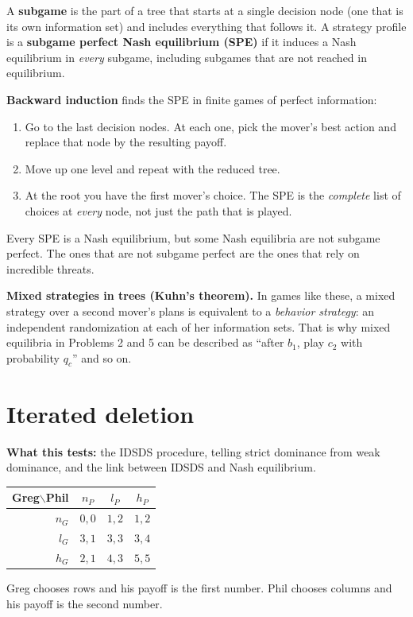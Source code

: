 \documentclass[11pt]{article}
\begin{document}
\begin{keyidea}
A \textbf{subgame} is the part of a tree that starts at a single decision node (one that is its own information set) and includes everything that follows it. A strategy profile is a \textbf{subgame perfect Nash equilibrium (SPE)} if it induces a Nash equilibrium in \emph{every} subgame, including subgames that are not reached in equilibrium.
\end{keyidea}
\textbf{Backward induction} finds the SPE in finite games of perfect information:
\begin{enumerate}
\item Go to the last decision nodes. At each one, pick the mover's best action and replace that node by the resulting payoff.
\item Move up one level and repeat with the reduced tree.
\item At the root you have the first mover's choice. The SPE is the \emph{complete} list of choices at \emph{every} node, not just the path that is played.
\end{enumerate}
Every SPE is a Nash equilibrium, but some Nash equilibria are not subgame perfect. The ones that are not subgame perfect are the ones that rely on incredible threats.

\textbf{Mixed strategies in trees (Kuhn's theorem).} In games like these, a mixed strategy over a second mover's plans is equivalent to a \emph{behavior strategy}: an independent randomization at each of her information sets. That is why mixed equilibria in Problems 2 and 5 can be described as ``after $b_1$, play $c_2$ with probability $q_c$'' and so on.

\newpage
\section{Iterated deletion}

\textbf{What this tests:} the IDSDS procedure, telling strict dominance from weak dominance, and the link between IDSDS and Nash equilibrium.

\begin{center}
\begin{tabular}{r|ccc}
Greg$\backslash$Phil & $n_P$ & $l_P$ & $h_P$ \\ \hline
$n_G$ & $0,0$ & $1,2$ & $1,2$ \\
$l_G$ & $3,1$ & $3,3$ & $3,4$ \\
$h_G$ & $2,1$ & $4,3$ & $5,5$
\end{tabular}
\end{center}
Greg chooses rows and his payoff is the first number. Phil chooses columns and his payoff is the second number.
\end{document}
